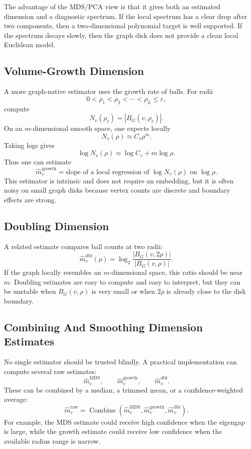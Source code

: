 \documentclass[11pt]{article}
\newcommand{\eps}{\varepsilon}
\begin{document}
The advantage of the MDS/PCA view is that it gives both an estimated dimension
and a diagnostic spectrum.  If the local spectrum has a clear drop after two
components, then a two-dimensional polynomial target is well supported.  If the
spectrum decays slowly, then the graph disk does not provide a clean local
Euclidean model.

\subsection{Volume-Growth Dimension}

A more graph-native estimator uses the growth rate of balls.  For radii
\[
  0<\rho_1<\rho_2<\cdots<\rho_L\le \eps,
\]
compute
\[
  N_v(\rho_\ell)
  =
  |B_G(v,\rho_\ell)|.
\]
On an \(m\)-dimensional smooth space, one expects locally
\[
  N_v(\rho)\approx C_v \rho^m.
\]
Taking logs gives
\[
  \log N_v(\rho)
  \approx
  \log C_v + m\log \rho.
\]
Thus one can estimate
\[
  \widehat m_v^{\mathrm{growth}}
  =
  \text{slope of a local regression of }
  \log N_v(\rho)
  \text{ on }
  \log \rho.
\]
This estimator is intrinsic and does not require an embedding, but it is often
noisy on small graph disks because vertex counts are discrete and boundary
effects are strong.

\subsection{Doubling Dimension}

A related estimate compares ball counts at two radii:
\[
  \widehat m_v^{\mathrm{dbl}}(\rho)
  =
  \log_2
  \frac{|B_G(v,2\rho)|}{|B_G(v,\rho)|}.
\]
If the graph locally resembles an \(m\)-dimensional space, this ratio should be
near \(m\).  Doubling estimates are easy to compute and easy to interpret, but
they can be unstable when \(B_G(v,\rho)\) is very small or when \(2\rho\) is
already close to the disk boundary.

\subsection{Combining And Smoothing Dimension Estimates}

No single estimator should be trusted blindly.  A practical implementation can
compute several raw estimates:
\[
  \widehat m_v^{\mathrm{MDS}},\qquad
  \widehat m_v^{\mathrm{growth}},\qquad
  \widehat m_v^{\mathrm{dbl}}.
\]
These can be combined by a median, a trimmed mean, or a confidence-weighted
average:
\[
  \widehat m_v^{\mathrm{raw}}
  =
  \operatorname{Combine}
  \left(
  \widehat m_v^{\mathrm{MDS}},
  \widehat m_v^{\mathrm{growth}},
  \widehat m_v^{\mathrm{dbl}}
  \right).
\]
For example, the MDS estimate could receive high confidence when the eigengap
is large, while the growth estimate could receive low confidence when the
available radius range is narrow.
\end{document}
